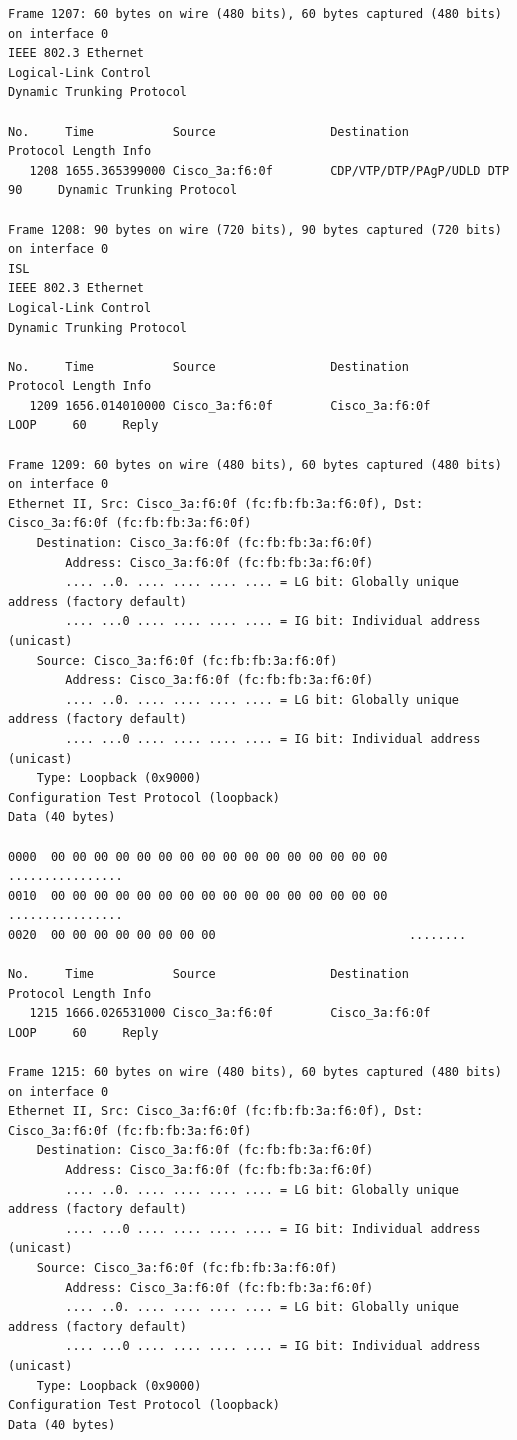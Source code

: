 \documentclass[a4paper,11pt]{article}
\begin{document}
\begin{lstlisting}
Frame 1207: 60 bytes on wire (480 bits), 60 bytes captured (480 bits) on interface 0
IEEE 802.3 Ethernet 
Logical-Link Control
Dynamic Trunking Protocol

No.     Time           Source                Destination           Protocol Length Info
   1208 1655.365399000 Cisco_3a:f6:0f        CDP/VTP/DTP/PAgP/UDLD DTP      90     Dynamic Trunking Protocol

Frame 1208: 90 bytes on wire (720 bits), 90 bytes captured (720 bits) on interface 0
ISL
IEEE 802.3 Ethernet 
Logical-Link Control
Dynamic Trunking Protocol

No.     Time           Source                Destination           Protocol Length Info
   1209 1656.014010000 Cisco_3a:f6:0f        Cisco_3a:f6:0f        LOOP     60     Reply

Frame 1209: 60 bytes on wire (480 bits), 60 bytes captured (480 bits) on interface 0
Ethernet II, Src: Cisco_3a:f6:0f (fc:fb:fb:3a:f6:0f), Dst: Cisco_3a:f6:0f (fc:fb:fb:3a:f6:0f)
    Destination: Cisco_3a:f6:0f (fc:fb:fb:3a:f6:0f)
        Address: Cisco_3a:f6:0f (fc:fb:fb:3a:f6:0f)
        .... ..0. .... .... .... .... = LG bit: Globally unique address (factory default)
        .... ...0 .... .... .... .... = IG bit: Individual address (unicast)
    Source: Cisco_3a:f6:0f (fc:fb:fb:3a:f6:0f)
        Address: Cisco_3a:f6:0f (fc:fb:fb:3a:f6:0f)
        .... ..0. .... .... .... .... = LG bit: Globally unique address (factory default)
        .... ...0 .... .... .... .... = IG bit: Individual address (unicast)
    Type: Loopback (0x9000)
Configuration Test Protocol (loopback)
Data (40 bytes)

0000  00 00 00 00 00 00 00 00 00 00 00 00 00 00 00 00   ................
0010  00 00 00 00 00 00 00 00 00 00 00 00 00 00 00 00   ................
0020  00 00 00 00 00 00 00 00                           ........

No.     Time           Source                Destination           Protocol Length Info
   1215 1666.026531000 Cisco_3a:f6:0f        Cisco_3a:f6:0f        LOOP     60     Reply

Frame 1215: 60 bytes on wire (480 bits), 60 bytes captured (480 bits) on interface 0
Ethernet II, Src: Cisco_3a:f6:0f (fc:fb:fb:3a:f6:0f), Dst: Cisco_3a:f6:0f (fc:fb:fb:3a:f6:0f)
    Destination: Cisco_3a:f6:0f (fc:fb:fb:3a:f6:0f)
        Address: Cisco_3a:f6:0f (fc:fb:fb:3a:f6:0f)
        .... ..0. .... .... .... .... = LG bit: Globally unique address (factory default)
        .... ...0 .... .... .... .... = IG bit: Individual address (unicast)
    Source: Cisco_3a:f6:0f (fc:fb:fb:3a:f6:0f)
        Address: Cisco_3a:f6:0f (fc:fb:fb:3a:f6:0f)
        .... ..0. .... .... .... .... = LG bit: Globally unique address (factory default)
        .... ...0 .... .... .... .... = IG bit: Individual address (unicast)
    Type: Loopback (0x9000)
Configuration Test Protocol (loopback)
Data (40 bytes)


\end{lstlisting}
\end{document}

